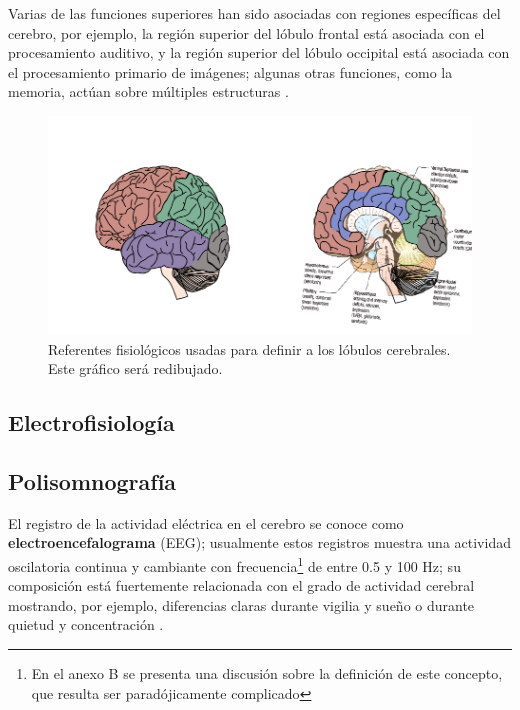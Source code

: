 Varias de las funciones superiores han sido asociadas con regiones específicas del cerebro, por
ejemplo, la región superior del lóbulo frontal está asociada con el procesamiento auditivo, y la
región superior del lóbulo occipital está asociada con el procesamiento primario de imágenes;
algunas otras funciones, como la memoria, actúan sobre múltiples estructuras \cite{Clark98_2}.

\begin{figure}
\centering
\includegraphics[width=\linewidth]{./img_diagramas/cerebro_zonas.pdf} 
\caption{Referentes fisiológicos usadas para definir a los lóbulos cerebrales. 
Este gráfico será redibujado.
}
\label{lobulos}
\end{figure}


\subsection{Electrofisiología}

\subsection{Polisomnografía}

El registro de la actividad eléctrica en el cerebro se conoce como \textbf{electroencefalograma} 
(EEG); usualmente estos registros muestra una actividad oscilatoria continua y cambiante con 
frecuencia\footnote{En el anexo B se presenta una discusión sobre la definición de este concepto, 
que resulta ser paradójicamente complicado} de entre 0.5 y 100 Hz; su composición está fuertemente 
relacionada con el grado de actividad cerebral mostrando, por ejemplo, diferencias claras durante 
vigilia y sueño o durante quietud y concentración \cite{Clark98_2}.

